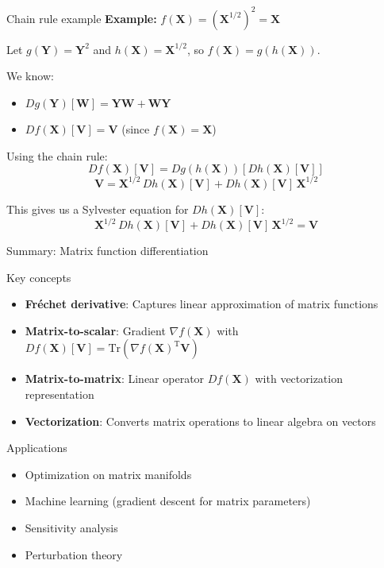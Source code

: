 \documentclass[aspectratio=1610]{beamer}
\begin{document}
\begin{frame}{Chain rule example}
  \textbf{Example:} $f(\mathbf{X}) = (\mathbf{X}^{1/2})^2 = \mathbf{X}$
  
  Let $g(\mathbf{Y}) = \mathbf{Y}^2$ and $h(\mathbf{X}) = \mathbf{X}^{1/2}$, so $f(\mathbf{X}) = g(h(\mathbf{X}))$.
  
  We know:
  \begin{itemize}
    \item $Dg(\mathbf{Y})[\mathbf{W}] = \mathbf{Y}\mathbf{W} + \mathbf{W}\mathbf{Y}$
    \item $Df(\mathbf{X})[\mathbf{V}] = \mathbf{V}$ (since $f(\mathbf{X}) = \mathbf{X}$)
  \end{itemize}
  
  Using the chain rule:
  $$Df(\mathbf{X})[\mathbf{V}] = Dg(h(\mathbf{X}))[Dh(\mathbf{X})[\mathbf{V}]]$$
  $$\mathbf{V} = \mathbf{X}^{1/2} \, Dh(\mathbf{X})[\mathbf{V}] + Dh(\mathbf{X})[\mathbf{V}] \, \mathbf{X}^{1/2}$$
  
  This gives us a Sylvester equation for $Dh(\mathbf{X})[\mathbf{V}]$:
  $$\mathbf{X}^{1/2} \, Dh(\mathbf{X})[\mathbf{V}] + Dh(\mathbf{X})[\mathbf{V}] \, \mathbf{X}^{1/2} = \mathbf{V}$$
\end{frame}

\begin{frame}{Summary: Matrix function differentiation}
  \begin{block}{Key concepts}
    \begin{itemize}
      \item \textbf{Fréchet derivative}: Captures linear approximation of matrix functions
      \item \textbf{Matrix-to-scalar}: Gradient $\nabla f(\mathbf{X})$ with $Df(\mathbf{X})[\mathbf{V}] = \mathrm{Tr}(\nabla f(\mathbf{X})^\mathrm{T} \mathbf{V})$
      \item \textbf{Matrix-to-matrix}: Linear operator $Df(\mathbf{X})$ with vectorization representation
      \item \textbf{Vectorization}: Converts matrix operations to linear algebra on vectors
    \end{itemize}
  \end{block}
  
  \begin{block}{Applications}
    \begin{itemize}
      \item Optimization on matrix manifolds
      \item Machine learning (gradient descent for matrix parameters)
      \item Sensitivity analysis
      \item Perturbation theory
    \end{itemize}
  \end{block}
\end{frame}
\end{document}
